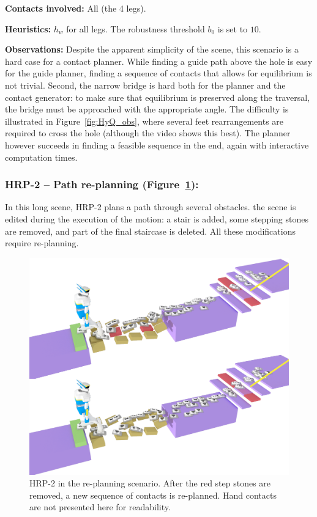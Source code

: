 \noindent\textbf{Contacts involved:} All (the 4 legs).

\noindent\textbf{Heuristics:} $h_w$ for all legs. The robustness threshold $b_0$ is set to $10$.

\noindent\textbf{Observations:} Despite the apparent simplicity of the scene, this scenario is a hard case for a contact planner.
While finding a guide path above the hole is easy for the guide planner, finding a sequence of contacts that allows for equilibrium is not trivial.
Second, the narrow bridge is hard both for the planner and the contact generator: to make sure that equilibrium is preserved along the traversal,
the bridge must be approached with the appropriate angle.
The difficulty is illustrated in Figure~\ref{fig:HyQ_obs}, where several feet rearrangements are required to cross the hole (although the video shows this best).
The planner however succeeds in finding a feasible sequence in the end, again with \gls{interactive} computation times.

\subsubsection{HRP-2 -- Path re-planning (Figure~\ref{fig:re-planning}):}
In this long scene, HRP-2 plans a path through several obstacles. the scene is edited during the execution of the motion: a stair is added,
some stepping stones are removed, and part of the final staircase is deleted. All these modifications require re-planning.


\begin{figure}
  \centering
  \includegraphics[width=0.7\linewidth]{figures/replanning}
  \caption{
           HRP-2 in the re-planning scenario. After the red step stones are removed, a new sequence of contacts is re-planned. Hand contacts
           are not presented here for readability.}
		   \label{fig:re-planning}
\end{figure}

